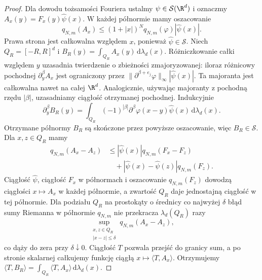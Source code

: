 \begin{proof}
Dla dowodu tożsamości Fouriera ustalmy
$\psi\in\mathcal S(\R^d)$ i oznaczmy
$A_x(y)=F_x(y)\widehat\psi(x)$.
W każdej półnormie mamy oszacowanie
\[
 q_{N,m}(A_x)\le(1+|x|)^N
 q_{N,m}(\varphi)|\widehat\psi(x)|.
\]
Prawa strona jest całkowalna względem $x$,
ponieważ $\widehat\psi\in\mathcal S$.
Niech $Q_R=[-R,R]^d$ i
$B_R(y)=\int_{Q_R}A_x(y)\,\mathrm d\lambda_d(x)$.
Różniczkowanie całki względem $y$ uzasadnia
twierdzenie o zbieżności zmajoryzowanej:
iloraz różnicowy pochodnej $\partial_y^\beta A_x$
jest ograniczony przez
$\|\partial^{\beta+e_j}\varphi\|_\infty
|\widehat\psi(x)|$.
Ta majoranta jest całkowalna nawet na całej $\R^d$.
Analogicznie, używając majoranty z pochodną rzędu
$|\beta|$, uzasadniamy ciągłość otrzymanej pochodnej.
Indukcyjnie
\[
 \partial_y^\beta B_R(y)=\int_{Q_R}
 (-1)^{|\beta|}\partial^\beta\varphi(x-y)
 \widehat\psi(x)\,\mathrm d\lambda_d(x).
\]
Otrzymane
półnormy $B_R$ są skończone przez powyższe
oszacowanie, więc $B_R\in\mathcal S$.
Dla $x,z\in Q_R$ mamy
\[
 \begin{aligned}
 q_{N,m}(A_x-A_z)
 &\le |\widehat\psi(x)|q_{N,m}(F_x-F_z)\\
 &\quad+|\widehat\psi(x)-\widehat\psi(z)|q_{N,m}(F_z).
 \end{aligned}
\]
Ciągłość $\widehat\psi$, ciągłość $F_x$ w półnormach
i oszacowanie $q_{N,m}(F_z)$ dowodzą ciągłości
$x\mapsto A_x$ w każdej półnormie, a zwartość
$Q_R$ daje jednostajną ciągłość w tej półnormie.
Dla podziału $Q_R$ na prostokąty o średnicy
co najwyżej $\delta$ błąd sumy Riemanna
w półnormie $q_{N,m}$ nie przekracza
$\lambda_d(Q_R)$ razy
\[
 \sup_{\substack{x,z\in Q_R\\|x-z|\le\delta}}
 q_{N,m}(A_x-A_z),
\]
co dąży do zera przy $\delta\downarrow0$.
Ciągłość $T$ pozwala przejść do granicy sum,
a po stronie skalarnej całkujemy funkcję ciągłą
$x\mapsto\langle T,A_x\rangle$. Otrzymujemy
$\langle T,B_R\rangle=\int_{Q_R}\langle T,A_x\rangle
\,\mathrm d\lambda_d(x)$.


\end{proof}
